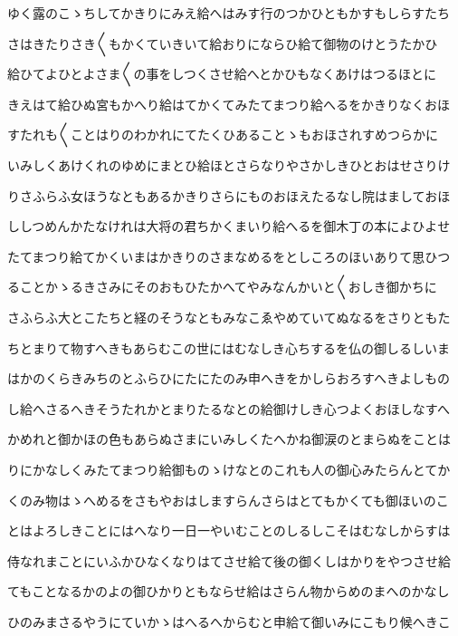 \documentclass[a4paper,11pt,landscape]{ltjtarticle}
\begin{document}
\par\medskip
ゆく露のこゝちしてかきりにみえ給へはみす行のつかひともかすもしらすたち
\par\medskip
さはきたりさき〱もかくていきいて給おりにならひ給て御物のけとうたかひ
\par\medskip
給ひてよひとよさま〱の事をしつくさせ給へとかひもなくあけはつるほとに
\par\medskip
きえはて給ひぬ宮もかへり給はてかくてみたてまつり給へるをかきりなくおほ
\par\medskip
すたれも〱ことはりのわかれにてたくひあることゝもおほされすめつらかに
\par\medskip
いみしくあけくれのゆめにまとひ給ほとさらなりやさかしきひとおはせさりけ
\par\medskip
りさふらふ女ほうなともあるかきりさらにものおほえたるなし院はましておほ
\par\medskip
ししつめんかたなけれは大将の君ちかくまいり給へるを御木丁の本によひよせ
\par\medskip
たてまつり給てかくいまはかきりのさまなめるをとしころのほいありて思ひつ
\par\medskip
ることかゝるきさみにそのおもひたかへてやみなんかいと〱おしき御かちに
\par\medskip
さふらふ大とこたちと経のそうなともみなこゑやめていてぬなるをさりともた
\par\medskip
ちとまりて物すへきもあらむこの世にはむなしき心ちするを仏の御しるしいま
\par\medskip
はかのくらきみちのとふらひにたにたのみ申へきをかしらおろすへきよしもの
\par\medskip
し給へさるへきそうたれかとまりたるなとの給御けしき心つよくおほしなすへ
\par\medskip
かめれと御かほの色もあらぬさまにいみしくたへかね御涙のとまらぬをことは
\par\medskip
りにかなしくみたてまつり給御ものゝけなとのこれも人の御心みたらんとてか
\par\medskip
くのみ物はゝへめるをさもやおはしますらんさらはとてもかくても御ほいのこ
\par\medskip
とはよろしきことにはへなり一日一やいむことのしるしこそはむなしからすは
\par\medskip
侍なれまことにいふかひなくなりはてさせ給て後の御くしはかりをやつさせ給
\par\medskip
てもことなるかのよの御ひかりともならせ給はさらん物からめのまへのかなし
\par\medskip
ひのみまさるやうにていかゝはへるへからむと申給て御いみにこもり候へきこ
\par\medskip
\end{document}
